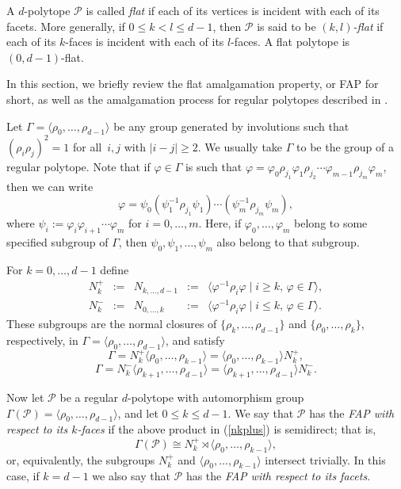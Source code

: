 \documentclass[10pt,a4paper]{amsart}
\theoremstyle{definition}
\begin{document}
A $d$-polytope $\mathcal{P}$ is called {\em flat\/} if each of its vertices is incident with each of its facets.  More generally, if $0 \leq k < l \leq d-1$, then $\mathcal{P}$ is said to be {\em $(k,l)$-flat\/} if each of its $k$-faces is incident with each of its $l$-faces. A flat polytope is $(0,d-1)$-flat.

In this section, we briefly review the flat amalgamation property, or FAP for short, as well as the amalgamation process for regular polytopes described in \cite[Sects.\,4E,\,4F]{McMSch2002}.

Let $\Gamma = \langle\rho_{0},\ldots,\rho_{d-1}\rangle$ be any group generated by involutions such that $(\rho_{i}\rho_{j})^{2} = 1$ for all~$i,j$ with $|i-j| \geq 2$. We usually take $\Gamma$ to be the group of a regular polytope.  Note that if $\varphi\in \Gamma$ is such that 
$\varphi = \varphi_{0}\rho_{j_{1}}\varphi_{1}\rho_{j_{2}} \cdots 
\varphi_{m-1}\rho_{j_{m}}\varphi_{m}$, 
then we can write 
\[\varphi  = \psi_{0}(\psi_{1}^{-1}\rho_{j_{1}}\psi_{1}) \cdots
(\psi_{m}^{-1}\rho_{j_{m}}\psi_{m}),  \]
where  $\psi_{i} := \varphi_{i}\varphi_{i+1} \cdots \varphi_{m}$ for $i = 0,\ldots,m$. 
Here, if $\varphi_{0},\ldots,\varphi_{m}$ belong to some specified subgroup
of $\Gamma$, then $\psi_{0},\psi_{1},\ldots,\psi_{m}$ also belong to that subgroup.

For $k = 0,\ldots,d-1$ define
\[\begin{array}{rclcl}
N_{k}^{+} & := & N_{k,\ldots,d-1} & := & \langle\varphi^{-1}\rho_{i}\varphi \mid i \geq k,\, \varphi \in
\Gamma\rangle,  \\[.03in]
N_{k}^{-} & := & N_{0,\ldots,k} & := & \langle\varphi^{-1}\rho_{i}\varphi \mid i  \leq k,\,\varphi \in
\Gamma\rangle.
\end{array}\]
These subgroups are the normal closures of $\{\rho_{k},\ldots,\rho_{d-1}\}$ and
$\{\rho_{0},\ldots,\rho_{k}\}$, respectively, in $\Gamma =
\langle\rho_{0},\ldots,\rho_{d-1}\rangle$, and satisfy 
\begin{equation}
\label{nkplus}
\Gamma = N_{k}^{+} \langle\rho_{0},\ldots,\rho_{k-1}\rangle =
\langle\rho_{0},\ldots,\rho_{k-1}\rangle N_{k}^{+},
\end{equation}
\begin{equation}
\label{nkminus}
\Gamma = N_{k}^{-} \langle\rho_{k+1},\ldots,\rho_{d-1}\rangle =
\langle\rho_{k+1},\ldots,\rho_{d-1}\rangle N_{k}^{-}.
\end{equation}

Now let $\mathcal{P}$ be a regular $d$-polytope with automorphism group $\Gamma(\mathcal{P}) =\langle\rho_{0},\ldots,\rho_{d-1}\rangle$, and let $0 \leq k \leq d-1$.   We say that $\mathcal{P}$ has the {\em FAP with respect to its $k$-faces\/} if the above product in (\ref{nkplus}) is semidirect; that is, \[\Gamma(\mathcal{P}) \cong N_{k}^{+} \rtimes \langle\rho_{0},\ldots,\rho_{k-1}\rangle,\]
or, equivalently, the subgroups $N_{k}^{+}$ and $\langle\rho_{0},\ldots,\rho_{k-1}\rangle$ intersect trivially. In this case, if $k=d-1$ we also say that $\mathcal{P}$ has the {\em FAP with respect to its facets\/}.
\end{document}
